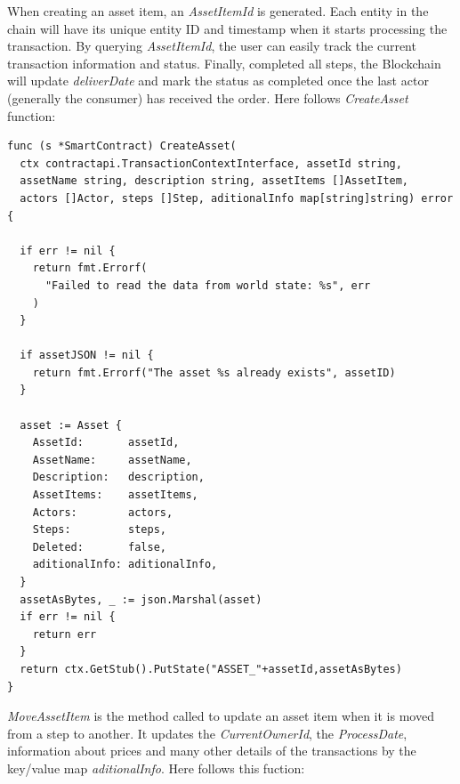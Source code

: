 When creating an asset item, an \textit{AssetItemId} is generated. Each entity in the chain will have its unique entity ID and timestamp when it starts processing the transaction. By querying \textit{AssetItemId}, the user can easily track the current transaction information and status. Finally, completed all steps, the Blockchain will update \textit{deliverDate} and mark the status as completed once the last actor (generally the consumer) has received the order. Here follows \textit{CreateAsset} function:

\begin{verbatim}
func (s *SmartContract) CreateAsset(
  ctx contractapi.TransactionContextInterface, assetId string,
  assetName string, description string, assetItems []AssetItem, 
  actors []Actor, steps []Step, aditionalInfo map[string]string) error {
  
  if err != nil {
    return fmt.Errorf(
      "Failed to read the data from world state: %s", err
    )
  }

  if assetJSON != nil {
    return fmt.Errorf("The asset %s already exists", assetID)
  }
  
  asset := Asset {
    AssetId:       assetId,
    AssetName:     assetName,
    Description:   description,
    AssetItems:    assetItems,
    Actors:        actors,
    Steps:         steps,
    Deleted:       false,
    aditionalInfo: aditionalInfo,
  }
  assetAsBytes, _ := json.Marshal(asset)
  if err != nil {
    return err
  }
  return ctx.GetStub().PutState("ASSET_"+assetId,assetAsBytes)
}
\end{verbatim}

\textit{MoveAssetItem} is the method called to update an asset item when it is moved from a step to another. It updates the \textit{CurrentOwnerId}, the \textit{ProcessDate}, information about prices and many other details of the transactions by the key/value map \textit{  aditionalInfo}. Here follows this fuction:

